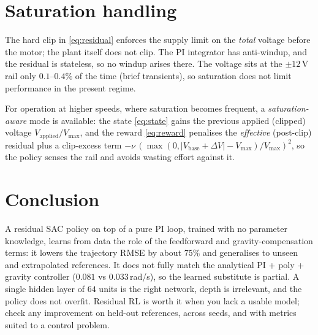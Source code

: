 \documentclass[10pt,twocolumn]{article}
\begin{document}
\section{Saturation handling}
The hard clip in \eqref{eq:residual} enforces the supply limit on the
\emph{total} voltage before the motor; the plant itself does not clip.
The PI integrator has anti-windup, and the residual is stateless, so no
windup arises there. The voltage sits at the $\pm12$\,V rail only
$0.1$--$0.4\%$ of the time (brief transients), so saturation does not
limit performance in the present regime.

For operation at higher speeds, where saturation becomes frequent, a
\emph{saturation-aware} mode is available: the state \eqref{eq:state}
gains the previous applied (clipped) voltage $V_{\mathrm{applied}}/
V_{\max}$, and the reward \eqref{eq:reward} penalises the
\emph{effective} (post-clip) residual plus a clip-excess term
$-\nu\,(\max(0,|V_{\mathrm{base}}+\Delta V|-V_{\max})/V_{\max})^2$, so the
policy senses the rail and avoids wasting effort against it.

\section{Conclusion}
A residual SAC policy on top of a pure PI loop, trained with no
parameter knowledge, learns from data the role of the feedforward and
gravity-compensation terms: it lowers the trajectory RMSE by about
$75\%$ and generalises to unseen and extrapolated references. It does
not fully match the analytical PI + poly + gravity controller ($0.081$
vs $0.033$\,rad/s), so the learned substitute is partial. A single
hidden layer of $64$ units is the right network, depth is irrelevant,
and the policy does not overfit. Residual RL is worth it when you lack a usable model;
check any improvement on held-out references, across seeds, and with
metrics suited to a control problem.
\end{document}
